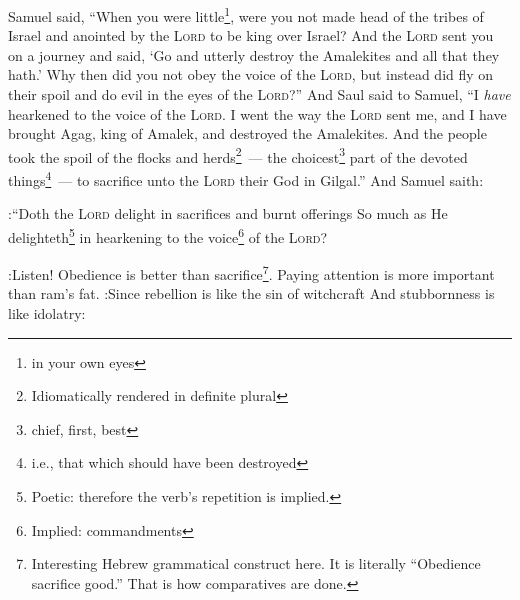 \begin{enumerate*}[mode=unboxed]
     Samuel said, ``When you were little\footnote{in your own eyes}, were you not made head of the tribes of Israel and anointed by the \textsc{Lord} to be king over Israel?%
     And the \textsc{Lord} sent you on a journey and said, `Go and utterly destroy the Amalekites and all that they hath.'%
     Why then did you not obey the voice of the \textsc{Lord}, but instead did fly on their spoil and do evil in the eyes of the \textsc{Lord}?''%
     And Saul said to Samuel, ``I \emph{have} hearkened to the voice of the \textsc{Lord}. I went the way the \textsc{Lord} sent me, and I have brought Agag, king of Amalek, and destroyed the Amalekites.%
     And the people took the spoil of the flocks and herds\footnote{Idiomatically rendered in definite plural}~--- the choicest\footnote{chief, first, best} part of the devoted things\footnote{i.e., that which should have been destroyed}~--- to sacrifice unto the \textsc{Lord} their God in Gilgal.''%
     And Samuel saith:
    
:``Doth the \textsc{Lord} delight in sacrifices and burnt offerings So much as He delighteth\footnote{Poetic: therefore the verb's repetition is implied.} in hearkening to the voice\footnote{Implied: commandments} of the \textsc{Lord}?

:Listen! Obedience is better than sacrifice\footnote{Interesting Hebrew grammatical construct here. It is literally ``Obedience sacrifice good.'' That is how comparatives are done.}. Paying attention is more important than ram's fat.%
     :Since rebellion is like the sin of witchcraft And stubbornness is like idolatry:


\end{enumerate*}
